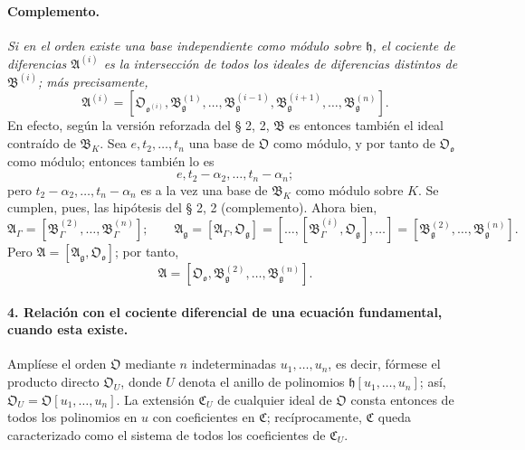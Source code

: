 \paragraph{Complemento.}
\emph{Si en el orden existe una base independiente como módulo sobre $\mathfrak h$, el cociente de diferencias $\mathfrak A^{(i)}$ es la intersección de todos los ideales de diferencias distintos de $\mathfrak B^{(i)}$; más precisamente,}
\[
\mathfrak A^{(i)}=
[\mathfrak O_{\mathfrak o^{(i)}},
\mathfrak B_{\mathfrak g}^{(1)},\ldots,
\mathfrak B_{\mathfrak g}^{(i-1)},
\mathfrak B_{\mathfrak g}^{(i+1)},\ldots,
\mathfrak B_{\mathfrak g}^{(n)}].
\]
En efecto, según la versión reforzada del § 2, 2, $\mathfrak B$ es entonces también el ideal contraído de $\mathfrak B_K$. Sea $e,t_2,\ldots,t_n$ una base de $\mathfrak O$ como módulo, y por tanto de $\mathfrak O_{\mathfrak o}$ como módulo; entonces también lo es
\[
e,t_2-\alpha_2,\ldots,t_n-\alpha_n;
\]
pero $t_2-\alpha_2,\ldots,t_n-\alpha_n$ es a la vez una base de $\mathfrak B_K$ como módulo sobre $K$. Se cumplen, pues, las hipótesis del § 2, 2 (complemento). Ahora bien,
\[
\mathfrak A_\Gamma=[\mathfrak B_\Gamma^{(2)},\ldots,\mathfrak B_\Gamma^{(n)}];
\qquad
\mathfrak A_\mathfrak g=[\mathfrak A_\Gamma,\mathfrak O_\mathfrak g]
=[\ldots,[\mathfrak B_\Gamma^{(i)},\mathfrak O_\mathfrak g],\ldots]
=[\mathfrak B_\mathfrak g^{(2)},\ldots,\mathfrak B_\mathfrak g^{(n)}].
\]
Pero $\mathfrak A=[\mathfrak A_\mathfrak g,\mathfrak O_{\mathfrak o}]$; por tanto,
\[
\mathfrak A=[\mathfrak O_{\mathfrak o},\mathfrak B_\mathfrak g^{(2)},\ldots,\mathfrak B_\mathfrak g^{(n)}].
\]

\paragraph{4. Relación con el cociente diferencial de una ecuación fundamental, cuando esta existe.}
Amplíese el orden $\mathfrak O$ mediante $n$ indeterminadas $u_1,\ldots,u_n$, es decir, fórmese el producto directo $\mathfrak O_U$, donde $U$ denota el anillo de polinomios $\mathfrak h[u_1,\ldots,u_n]$; así, $\mathfrak O_U=\mathfrak O[u_1,\ldots,u_n]$. La extensión $\mathfrak C_U$ de cualquier ideal de $\mathfrak O$ consta entonces de todos los polinomios en $u$ con coeficientes en $\mathfrak C$; recíprocamente, $\mathfrak C$ queda caracterizado como el sistema de todos los coeficientes de $\mathfrak C_U$.

